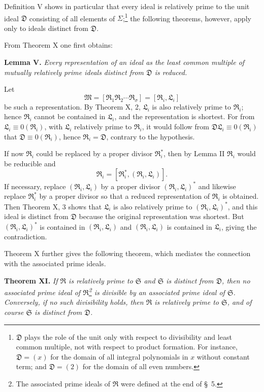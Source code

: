 \documentclass[11pt]{article}
\newcommand{\ideal}[1]{\mathfrak{#1}}
\begin{document}
Definition V shows in particular that every ideal is relatively prime to the unit ideal $\ideal D$ consisting of all elements of $\Sigma$;\footnote{$\ideal D$ plays the role of the unit only with respect to divisibility and least common multiple, not with respect to product formation. For instance, $\ideal D=(x)$ for the domain of all integral polynomials in $x$ without constant term; and $\ideal D=(2)$ for the domain of all even numbers.} the following theorems, however, apply only to ideals distinct from $\ideal D$.

From Theorem X one first obtains:

\textbf{Lemma V.} \emph{Every representation of an ideal as the least common multiple of mutually relatively prime ideals distinct from $\ideal D$ is reduced.}

Let
\[
 \ideal M=[\ideal R_1\ideal R_2\cdots\ideal R_\sigma]=[\ideal R_i,
\ideal L_i]
\]
be such a representation. By Theorem X, 2, $\ideal L_i$ is also relatively prime to $\ideal R_i$; hence $\ideal R_i$ cannot be contained in $\ideal L_i$, and the representation is shortest. For from $\ideal L_i\equiv0(\ideal R_i)$, with $\ideal L_i$ relatively prime to $\ideal R_i$, it would follow from $\ideal D\ideal L_i\equiv0(\ideal R_i)$ that $\ideal D\equiv0(\ideal R_i)$, hence $\ideal R_i=\ideal D$, contrary to the hypothesis.

If now $\ideal R_i$ could be replaced by a proper divisor $\ideal R_i^*$, then by Lemma II $\ideal R_i$ would be reducible and
\[
 \ideal R_i=[\ideal R_i^*,(\ideal R_i,
\ideal L_i)].
\]
If necessary, replace $(\ideal R_i,
\ideal L_i)$ by a proper divisor $(\ideal R_i,
\ideal L_i)^*$ and likewise replace $\ideal R_i^*$ by a proper divisor so that a reduced representation of $\ideal R_i$ is obtained. Then Theorem X, 3 shows that $\ideal L_i$ is also relatively prime to $(\ideal R_i,
\ideal L_i)^*$, and this ideal is distinct from $\ideal D$ because the original representation was shortest. But $(\ideal R_i,
\ideal L_i)^*$ is contained in $(\ideal R_i,
\ideal L_i)$ and $(\ideal R_i,
\ideal L_i)$ is contained in $\ideal L_i$, giving the contradiction.

Theorem X further gives the following theorem, which mediates the connection with the associated prime ideals.

\textbf{Theorem XI.} \emph{If $\ideal R$ is relatively prime to $\ideal S$ and $\ideal S$ is distinct from $\ideal D$, then no associated prime ideal of $\ideal R$\footnote{The associated prime ideals of $\ideal R$ were defined at the end of \S~5.} is divisible by an associated prime ideal of $\ideal S$. Conversely, if no such divisibility holds, then $\ideal R$ is relatively prime to $\ideal S$, and of course $\ideal S$ is distinct from $\ideal D$.}
\end{document}
